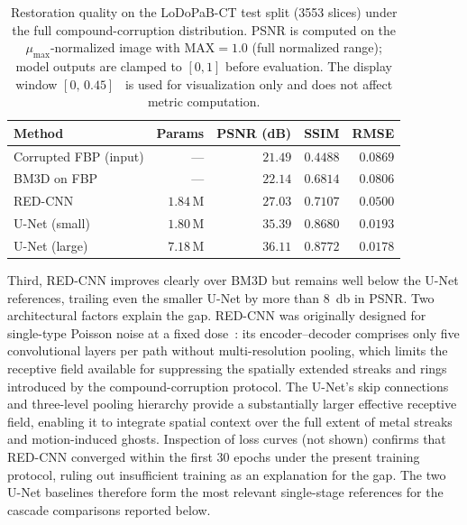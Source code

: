 \begin{table}[!htb]
    \centering
    \caption[Baseline references on LoDoPaB-CT under compound corruption.]{%
        Restoration quality on the LoDoPaB-CT test split
        (\num{3553} slices) under the full compound-corruption
        distribution. PSNR is computed on the $\mu_{\max}$-normalized image with
        $\mathrm{MAX}=1.0$ (full normalized range); model outputs are clamped to $[0,1]$
        before evaluation. The display window $[0,\,0.45]$~\cite{Leuschner2021} is used
        for visualization only and does not affect metric computation.}
    \label{tab:exp_baselines}
    \setlength{\tabcolsep}{6pt}
    \small
    \begin{tabular}{@{}l r r r r@{}}
        \toprule
        Method                              & Params    & PSNR (dB) & SSIM     & RMSE    \\
        \midrule
        Corrupted FBP (input)               & ---       & $21.49$   & $0.4488$ & $0.0869$ \\
        BM3D on FBP~\cite{Dabov2007}        & ---       & $22.14$   & $0.6814$ & $0.0806$ \\
        RED-CNN~\cite{Chen2017}             & $1.84$\,M & $27.03$   & $0.7107$ & $0.0500$ \\
        U-Net (small)                       & $1.80$\,M & $35.39$   & $0.8680$ & $0.0193$ \\
        U-Net (large)                       & $7.18$\,M & $\mathbf{36.11}$ & $\mathbf{0.8772}$ & $\mathbf{0.0178}$ \\
        \bottomrule
    \end{tabular}
\end{table}

Third, RED-CNN improves clearly over BM3D but remains well below the U-Net references, trailing even the smaller U-Net by more than \SI{8}{\decibel} in PSNR. Two architectural factors explain the gap. RED-CNN was originally designed for single-type Poisson noise at a fixed dose~\cite{Chen2017}: its encoder--decoder comprises only five convolutional layers per path without multi-resolution pooling, which limits the receptive field available for suppressing the spatially extended streaks and rings introduced by the compound-corruption protocol. The U-Net's skip connections and three-level pooling hierarchy provide a substantially larger effective receptive field, enabling it to integrate spatial context over the full extent of metal streaks and motion-induced ghosts. Inspection of loss curves (not shown) confirms that RED-CNN converged within the first 30 epochs under the present training protocol, ruling out insufficient training as an explanation for the gap. The two U-Net baselines therefore form the most relevant single-stage references for the cascade comparisons reported below.

